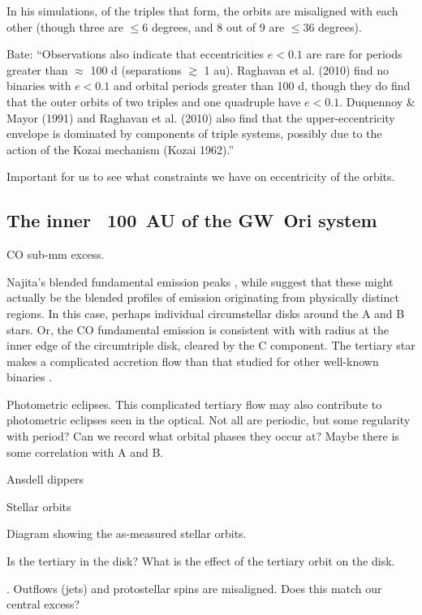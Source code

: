 \documentclass[twocolumn]{aastex61}
\begin{document}
In his simulations, of the triples that form, the orbits are misaligned with each other (though three are $\leq 6$ degrees, and 8 out of 9 are $\leq 36$ degrees).

Bate:  ``Observations also indicate that eccentricities $e < 0.1$ are rare for periods greater than $\approx$ 100 d (separations $\gtrsim$ 1 au). Raghavan et al. (2010) find no binaries with $e < 0.1$ and orbital periods greater than 100 d, though they do find that the outer orbits of two triples and one quadruple have $e < 0.1$. Duquennoy \& Mayor (1991) and Raghavan et al. (2010) also find that the upper-eccentricity envelope is dominated by components of triple systems, possibly due to the action of the Kozai mechanism (Kozai 1962).''

Important for us to see what constraints we have on eccentricity of the orbits.



\subsection{The inner ~100 \,AU of the GW~Ori system} \label{sec:inner disk}

CO sub-mm excess.

Najita's blended fundamental emission peaks \citep{najita03}, while \citet{bast11} suggest that these might actually be the blended profiles of emission originating from physically distinct regions. In this case, perhaps individual circumstellar disks around the A and B stars. Or, the CO fundamental emission is consistent with with radius at the inner edge of the circumtriple disk, cleared by the C component. The tertiary star makes a complicated accretion flow than that studied for other well-known binaries \citep[e.g., DQ~Tau;]{artymowicz94,mathieu97}.

Photometric eclipses. This complicated tertiary flow may also contribute to photometric eclipses seen in the optical. Not all are periodic, but some regularity with period? Can we record what orbital phases they occur at? Maybe there is some correlation with A and B.

Ansdell dippers

Stellar orbits

Diagram showing the as-measured stellar orbits.

Is the tertiary in the disk? What is the effect of the tertiary orbit on the disk.

\citep{offner16}. Outflows (jets) and protostellar spins are misaligned. Does this match our central excess?
\end{document}
